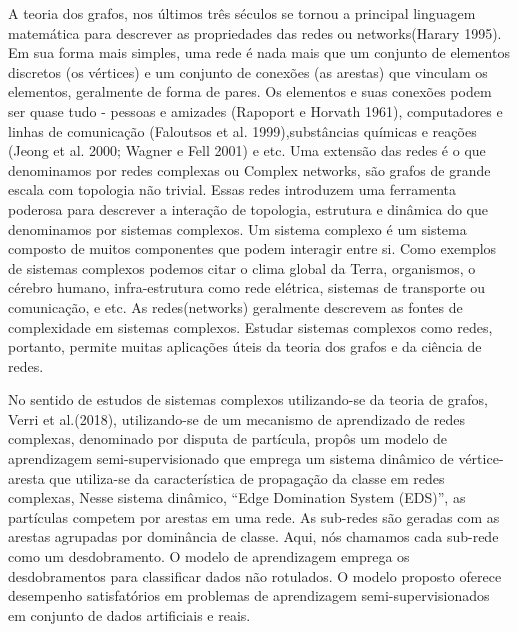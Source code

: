 \documentclass[conference]{IEEEtran}
\begin{document}
  A teoria dos grafos, nos últimos três séculos se tornou a principal linguagem matemática para descrever as propriedades das redes ou networks(Harary 1995\cite{b4}). Em sua forma mais simples, uma rede é
nada mais que um conjunto de elementos discretos (os vértices) e um conjunto de conexões (as arestas) que vinculam os elementos, geralmente de forma de pares. Os elementos e suas conexões podem ser quase tudo - pessoas e amizades (Rapoport e Horvath 1961\cite{b5}), computadores e linhas de comunicação (Faloutsos et al. 1999\cite{b6}),substâncias químicas e reações (Jeong et al. 2000; Wagner e Fell 2001) e etc. Uma extensão das redes é o que denominamos por redes complexas ou Complex networks, são grafos de grande escala com topologia não trivial. Essas redes introduzem uma ferramenta poderosa para descrever a interação de topologia, estrutura e dinâmica do que denominamos por sistemas complexos. Um sistema complexo é um sistema composto de muitos componentes que podem interagir entre si. Como exemplos de sistemas complexos podemos citar o clima global da Terra, organismos, o cérebro humano, infra-estrutura como rede elétrica, sistemas de transporte ou comunicação, e etc. 
As redes(networks) geralmente descrevem as fontes de complexidade em sistemas complexos. Estudar sistemas complexos como redes, portanto, permite muitas aplicações úteis da teoria dos grafos e da ciência de redes.

No sentido de estudos de sistemas complexos utilizando-se da teoria de grafos, Verri et al.(2018)\cite{b7}, utilizando-se de um mecanismo de aprendizado de redes complexas, denominado por disputa de partícula, propôs um modelo de aprendizagem semi-supervisionado que emprega um sistema dinâmico de vértice-aresta que utiliza-se da característica de propagação da classe em redes complexas, Nesse sistema dinâmico, ``Edge Domination System (EDS)'', as partículas competem por arestas em uma rede. As sub-redes são geradas com as arestas agrupadas por dominância de classe. Aqui, nós chamamos cada sub-rede como um desdobramento. O modelo de aprendizagem emprega os desdobramentos para classificar dados não rotulados. O modelo proposto oferece desempenho satisfatórios em problemas de aprendizagem semi-supervisionados em conjunto de dados artificiais e reais.
\end{document}
